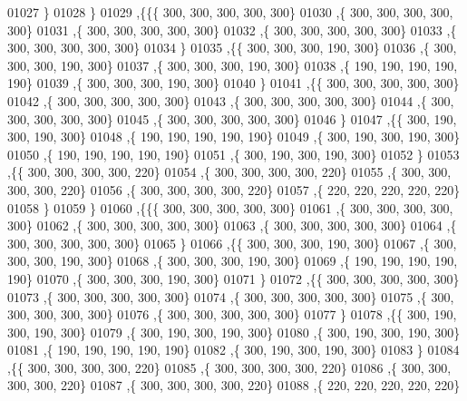 \begin{DoxyCode}
01027    \}
01028   \}
01029  ,\{\{\{   300,   300,   300,   300,   300\}
01030    ,\{   300,   300,   300,   300,   300\}
01031    ,\{   300,   300,   300,   300,   300\}
01032    ,\{   300,   300,   300,   300,   300\}
01033    ,\{   300,   300,   300,   300,   300\}
01034    \}
01035   ,\{\{   300,   300,   300,   190,   300\}
01036    ,\{   300,   300,   300,   190,   300\}
01037    ,\{   300,   300,   300,   190,   300\}
01038    ,\{   190,   190,   190,   190,   190\}
01039    ,\{   300,   300,   300,   190,   300\}
01040    \}
01041   ,\{\{   300,   300,   300,   300,   300\}
01042    ,\{   300,   300,   300,   300,   300\}
01043    ,\{   300,   300,   300,   300,   300\}
01044    ,\{   300,   300,   300,   300,   300\}
01045    ,\{   300,   300,   300,   300,   300\}
01046    \}
01047   ,\{\{   300,   190,   300,   190,   300\}
01048    ,\{   190,   190,   190,   190,   190\}
01049    ,\{   300,   190,   300,   190,   300\}
01050    ,\{   190,   190,   190,   190,   190\}
01051    ,\{   300,   190,   300,   190,   300\}
01052    \}
01053   ,\{\{   300,   300,   300,   300,   220\}
01054    ,\{   300,   300,   300,   300,   220\}
01055    ,\{   300,   300,   300,   300,   220\}
01056    ,\{   300,   300,   300,   300,   220\}
01057    ,\{   220,   220,   220,   220,   220\}
01058    \}
01059   \}
01060  ,\{\{\{   300,   300,   300,   300,   300\}
01061    ,\{   300,   300,   300,   300,   300\}
01062    ,\{   300,   300,   300,   300,   300\}
01063    ,\{   300,   300,   300,   300,   300\}
01064    ,\{   300,   300,   300,   300,   300\}
01065    \}
01066   ,\{\{   300,   300,   300,   190,   300\}
01067    ,\{   300,   300,   300,   190,   300\}
01068    ,\{   300,   300,   300,   190,   300\}
01069    ,\{   190,   190,   190,   190,   190\}
01070    ,\{   300,   300,   300,   190,   300\}
01071    \}
01072   ,\{\{   300,   300,   300,   300,   300\}
01073    ,\{   300,   300,   300,   300,   300\}
01074    ,\{   300,   300,   300,   300,   300\}
01075    ,\{   300,   300,   300,   300,   300\}
01076    ,\{   300,   300,   300,   300,   300\}
01077    \}
01078   ,\{\{   300,   190,   300,   190,   300\}
01079    ,\{   300,   190,   300,   190,   300\}
01080    ,\{   300,   190,   300,   190,   300\}
01081    ,\{   190,   190,   190,   190,   190\}
01082    ,\{   300,   190,   300,   190,   300\}
01083    \}
01084   ,\{\{   300,   300,   300,   300,   220\}
01085    ,\{   300,   300,   300,   300,   220\}
01086    ,\{   300,   300,   300,   300,   220\}
01087    ,\{   300,   300,   300,   300,   220\}
01088    ,\{   220,   220,   220,   220,   220\}

\end{DoxyCode}
